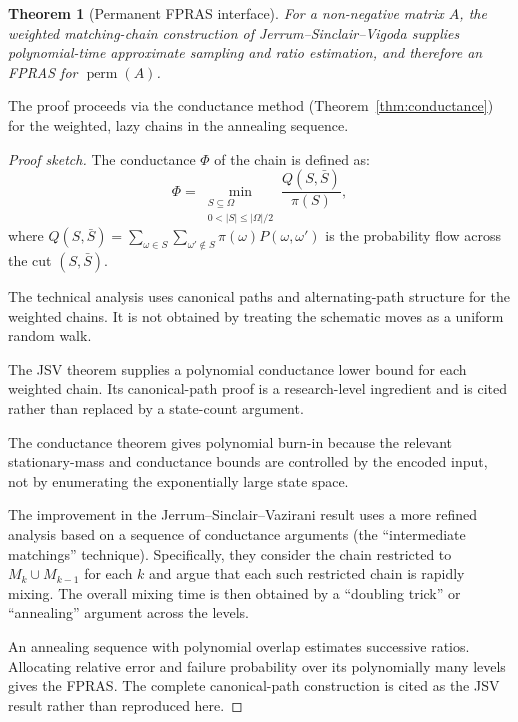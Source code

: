 \documentclass[twoside,12pt]{book}
\theoremstyle{plain}
\newtheorem{theorem}{Theorem}[chapter]
\theoremstyle{definition}
\theoremstyle{remark}
\begin{document}
\begin{theorem}[Permanent FPRAS interface]
\label{thm:jsv-mixing}
For a non-negative matrix $A$, the weighted matching-chain construction of
Jerrum--Sinclair--Vigoda supplies polynomial-time approximate sampling and
ratio estimation, and therefore an FPRAS for $\operatorname{perm}(A)$.
\end{theorem}

The proof proceeds via the conductance method (Theorem~\ref{thm:conductance})
for the weighted, lazy chains in the annealing sequence.

\begin{proof}[Proof sketch]
The conductance $\Phi$ of the chain is defined as:
\[
\Phi = \min_{\substack{S \subseteq \Omega \\ 0 < |S| \leq |\Omega|/2}} \frac{Q(S, \bar{S})}{\pi(S)},
\]
where $Q(S, \bar{S}) = \sum_{\omega \in S} \sum_{\omega' \notin S} \pi(\omega) P(\omega, \omega')$ is the probability flow across the cut $(S, \bar{S})$.

The technical analysis uses canonical paths and alternating-path structure for
the weighted chains. It is not obtained by treating the schematic moves as a
uniform random walk.

The JSV theorem supplies a polynomial conductance lower bound for each
weighted chain. Its canonical-path proof is a research-level ingredient and
is cited rather than replaced by a state-count argument.

The conductance theorem gives polynomial burn-in because the relevant
stationary-mass and conductance bounds are controlled by the encoded input,
not by enumerating the exponentially large state space.

The improvement in the Jerrum--Sinclair--Vazirani result uses a more refined analysis based on a sequence of conductance arguments (the ``intermediate matchings'' technique). Specifically, they consider the chain restricted to $M_k \cup M_{k-1}$ for each $k$ and argue that each such restricted chain is rapidly mixing. The overall mixing time is then obtained by a ``doubling trick'' or ``annealing'' argument across the levels.

An annealing sequence with polynomial overlap estimates successive ratios.
Allocating relative error and failure probability over its polynomially many
levels gives the FPRAS. The complete canonical-path construction is cited as
the JSV result rather than reproduced here.
\end{proof}
\end{document}
